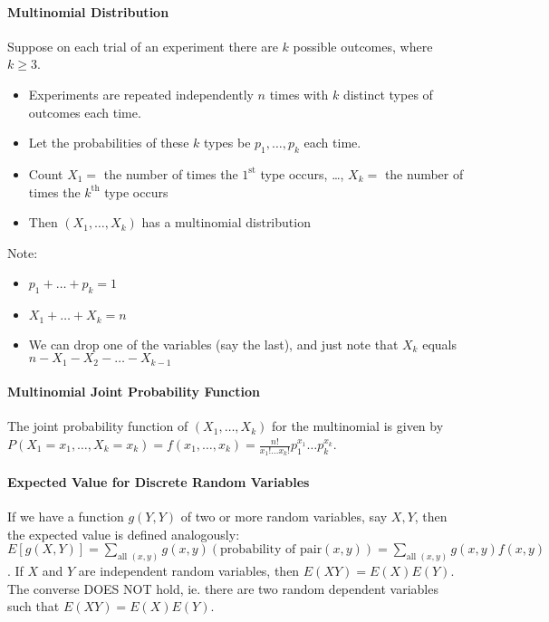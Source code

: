\documentclass[10pt,letter]{article}
\begin{document}
\paragraph{Multinomial Distribution} Suppose on each trial of an experiment there are $k$ possible outcomes, where $k\geq3$. \begin{itemize}
    \item Experiments are repeated independently $n$ times with $k$ distinct types of outcomes each time.
    \item Let the probabilities of these $k$ types be $p_1,\ldots,p_k$ each time.
    \item Count $X_1=$ the number of times the $1^{\text{st}}$ type occurs, \ldots, $X_k=$ the number of times the $k^{\text{th}}$ type occurs
    \item Then $(X_1,\ldots,X_k)$ has a multinomial distribution
\end{itemize} Note: \begin{itemize}
    \item $p_1+\ldots+p_k=1$
    \item $X_1+\ldots+X_k=n$
    \item We can drop one of the variables (say the last), and just note that $X_k$ equals $n-X_1-X_2-\ldots-X_{k-1}$
\end{itemize}

\paragraph{Multinomial Joint Probability Function} The joint probability function of $(X_1,\ldots, X_k)$ for the multinomial is given by $P(X_1=x_1,\ldots, X_k=x_k)=f(x_1,\ldots,x_k)=\frac{n!}{x_1!\ldots x_k!}p_1^{x_1}\ldots p_k^{x_k}$.

\paragraph{Expected Value for Discrete Random Variables} If we have a function $g(Y,Y)$ of two or more random variables, say $X,Y$, then the expected value is defined analogously: $E[g(X,Y)]=\sum_{\text{all }(x,y)}g(x,y)(\text{probability of pair}(x,y)) = \sum_{\text{all }(x,y)}g(x,y)f(x,y)$. If $X$ and $Y$ are independent random variables, then $E(XY)=E(X)E(Y)$. The converse DOES NOT hold, ie. there are two random dependent variables such that $E(XY)=E(X)E(Y)$. 
\end{document}
